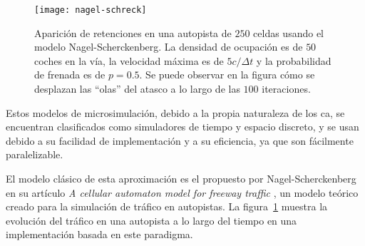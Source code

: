 \begin{figure}[t]
	\centering
	\texttt{[image: nagel-schreck]}
	\caption[Ejemplo de efecto de ondas de choque en simulación de tipo Nagel-Scherckenberg]{Aparición de retenciones en una autopista de $250$ celdas usando el modelo Nagel-Scherckenberg. La densidad de ocupación es de $50$ coches en la vía, la velocidad máxima es de $5 c/\Delta t$ y la probabilidad de frenada es de $p = 0.5$. Se puede observar en la figura cómo se desplazan las \enquote{olas} del atasco a lo largo de las $100$ iteraciones.}
	\label{fig:nagel-schreck}
\end{figure}


Estos modelos de microsimulación, debido a la propia naturaleza de los \gls{ca}, se encuentran clasificados como simuladores de tiempo y espacio discreto, y se usan debido a su facilidad de implementación y a su eficiencia, ya que son fácilmente paralelizable.

El modelo clásico de esta aproximación es el propuesto por Nagel-Scherckenberg en su artículo \textit{A cellular automaton model for freeway traffic} \cite{Nagel1992}, un modelo teórico creado para la simulación de tráfico en autopistas. La figura~\ref{fig:nagel-schreck} muestra la evolución del tráfico en una autopista a lo largo del tiempo en una implementación basada en este paradigma.

